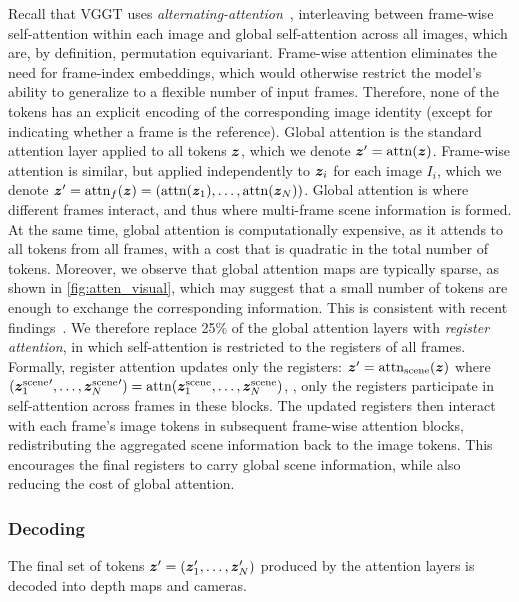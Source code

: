 Recall that VGGT uses \emph{alternating-attention}~\cite{wang25vggt}, interleaving between frame-wise self-attention within each image and global self-attention across all images, which are, by definition, permutation equivariant.
Frame-wise attention eliminates the need for frame-index embeddings, which would otherwise restrict the model's ability to generalize to a flexible number of input frames.
Therefore, none of the tokens has an explicit encoding of the corresponding image identity (except for indicating whether a frame is the reference).
{Global} attention is the standard attention layer applied to all tokens $\boldsymbol{z}$, which we denote
$
\boldsymbol{z}' = \operatorname{attn}(\boldsymbol{z})
$.
{Frame-wise} attention is similar, but applied independently to $\boldsymbol{z}_i$ for each image $I_i$,
which we denote
$
\boldsymbol{z}' =
\operatorname{attn}_f(\boldsymbol{z}) =
(
    \operatorname{attn}(\boldsymbol{z}_1), \dots,
    \operatorname{attn}(\boldsymbol{z}_N)
)
$.
Global attention is where different frames interact, and thus where multi-frame scene information is formed.
At the same time, global attention is computationally expensive, as it attends to all tokens from all frames, with a cost that is quadratic in the total number of tokens.
Moreover, we observe that global attention maps are typically sparse, as shown in \cref{fig:atten_visual}, which may suggest that a small number of tokens are enough to exchange the corresponding information.
This is consistent with recent findings~\cite{shen26fastvggt:, wang25faster}.
We therefore replace 25\% of the global attention layers with \emph{register attention}, in which self-attention is restricted to the registers of all frames.
Formally, register attention updates only the registers:
$
\boldsymbol{z}' = \operatorname{attn}_\text{scene}(\boldsymbol{z})
$
where
$
({\boldsymbol{z}^{\text{scene}}_1}',\dots,{\boldsymbol{z}^{\text{scene}}_N}') = \operatorname{attn}( \boldsymbol{z}^{\text{scene}}_1,\dots,\boldsymbol{z}^{\text{scene}}_N )
$,
\ie, only the registers participate in self-attention across frames in these blocks.
The updated registers then interact with each frame's image tokens in subsequent frame-wise attention blocks, redistributing the aggregated scene information back to the image tokens.
This encourages the final registers to carry global scene information, while also reducing the cost of global attention.

\subsubsection{Decoding}%
\label{sec:heads}

The final set of tokens $\boldsymbol{z}' = (\boldsymbol{z}_1',\dots,\boldsymbol{z}_N')$ produced by the attention layers is decoded into depth maps and cameras.

